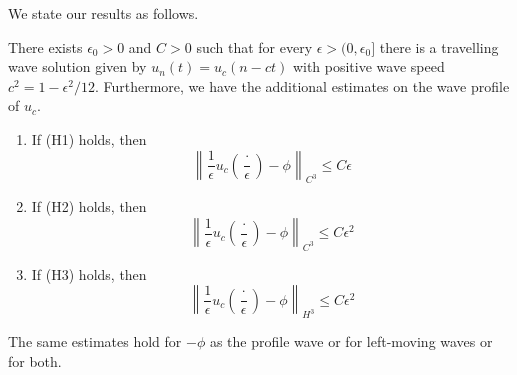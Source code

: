We state our results as follows.
\begin{theorem}
	There exists \(\epsilon_0> 0\) and \(C> 0\) such that for every \(\epsilon > (0,\epsilon_0]\) there is a travelling wave solution given by \(u_n(t) = u_c(n-ct)\) with positive wave speed \(c^2 = 1 - \epsilon^2/12\). Furthermore, we have the additional estimates on the wave profile of \(u_c\).
	\begin{enumerate}[label = (\roman*)]
		\item If (H1) holds, then
		\begin{equation}
			\left\| \frac 1 \epsilon u_c\left(\frac \cdot \epsilon \right) - \phi \right\|_{C^3} \leq C \epsilon
		\end{equation}
		\item If (H2) holds, then
		\begin{equation}
			\left\| \frac 1 \epsilon u_c\left(\frac \cdot \epsilon \right) - \phi \right\|_{C^3} \leq C \epsilon^2
		\end{equation}
		\item If (H3) holds, then
		\begin{equation}
			\left\| \frac 1 \epsilon u_c\left(\frac \cdot \epsilon \right) - \phi \right\|_{H^3} \leq C \epsilon^2
		\end{equation}
	\end{enumerate}
\end{theorem}
The same estimates hold for \(-\phi\) as the profile wave or for left-moving waves or for both.